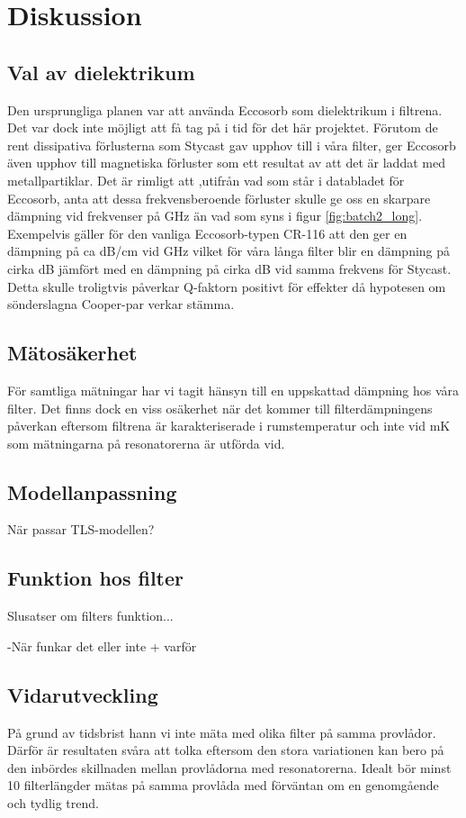 \documentclass[main.tex]{subfiles}
\begin{document}
\chapter{Diskussion}
\label{ch:discussion} 



\section{Val av dielektrikum}
Den ursprungliga planen var att använda Eccosorb som dielektrikum i filtrena. Det var dock inte möjligt att få tag på i tid för det här projektet. Förutom de rent dissipativa förlusterna som Stycast gav upphov till i våra filter, ger Eccosorb även upphov till magnetiska förluster som ett resultat av att det är laddat med metallpartiklar\autocite{Eccosorb}. Det är rimligt att ,utifrån vad som står i databladet för Eccosorb, anta att dessa frekvensberoende förluster skulle ge oss en skarpare dämpning vid frekvenser på \unit[8-50]{GHz} än vad som syns i figur \ref{fig:batch2_long}. Exempelvis gäller för den vanliga Eccosorb-typen CR-116 att den ger en dämpning på ca \unit[57]{dB/cm} vid \unit[18]{GHz}\autocite{Eccosorb} vilket för våra långa filter blir en dämpning på cirka \unit[150]{dB} jämfört med en dämpning på cirka \unit[10]{dB} vid samma frekvens för Stycast. Detta skulle troligtvis påverkar Q-faktorn positivt för effekter då hypotesen om sönderslagna Cooper-par verkar stämma.



\section{Mätosäkerhet}
För samtliga mätningar har vi tagit hänsyn till en uppskattad dämpning hos våra filter. Det finns dock en viss osäkerhet när det kommer till filterdämpningens påverkan eftersom filtrena är karakteriserade i rumstemperatur och inte vid \unit[10]{mK} som mätningarna på resonatorerna är utförda vid.


\section{Modellanpassning}
När passar TLS-modellen? 

\section{Funktion hos filter}
Slusatser om filters funktion...

-När funkar det eller inte + varför


\section{Vidarutveckling}
På grund av tidsbrist hann vi inte mäta med olika filter på samma provlådor. Därför är resultaten svåra att tolka eftersom den stora variationen kan bero på den inbördes skillnaden mellan provlådorna med resonatorerna. Idealt bör minst 10 filterlängder mätas på samma provlåda med förväntan om en genomgående och tydlig trend.
\end{document}
